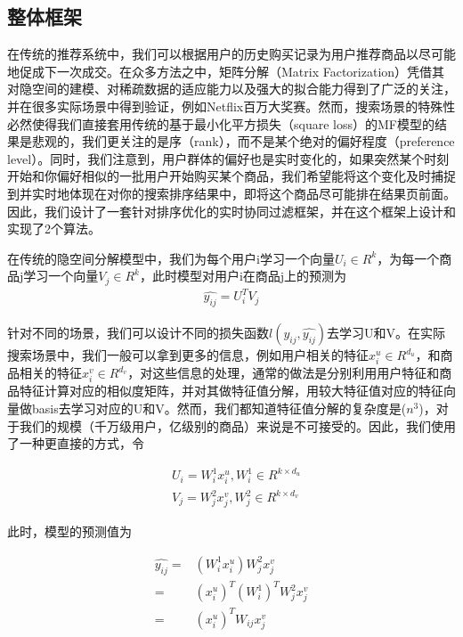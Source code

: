 \subsection{整体框架} 
 在传统的推荐系统中，我们可以根据用户的历史购买记录为用户推荐商品以尽可能地促成下一次成交。在众多方法之中，矩阵分解（Matrix Factorization）凭借其对隐空间的建模、对稀疏数据的适应能力以及强大的拟合能力得到了广泛的关注，并在很多实际场景中得到验证，例如Netflix百万大奖赛。然而，搜索场景的特殊性必然使得我们直接套用传统的基于最小化平方损失（square loss）的MF模型的结果是悲观的，我们更关注的是序（rank），而不是某个绝对的偏好程度（preference level）。同时，我们注意到，用户群体的偏好也是实时变化的，如果突然某个时刻开始和你偏好相似的一批用户开始购买某个商品，我们希望能将这个变化及时捕捉到并实时地体现在对你的搜索排序结果中，即将这个商品尽可能排在结果页前面。因此，我们设计了一套针对排序优化的实时协同过滤框架，并在这个框架上设计和实现了2个算法。

  在传统的隐空间分解模型中，我们为每个用户i学习一个向量$U_i \in R^k$，为每一个商品j学习一个向量$V_j \in R^k$，此时模型对用户i在商品j上的预测为
 \begin{equation}\label{yij}
	\begin{split}
		\hat{y_{ij}} = U^T_i V_j
	\end{split}
\end{equation}
 
  针对不同的场景，我们可以设计不同的损失函数$l(y_{ij},\hat{y_{ij}})$去学习U和V。在实际搜索场景中，我们一般可以拿到更多的信息，例如用户相关的特征$x_i^u \in R^{d_u}$，和商品相关的特征$x_i^v \in R^{d_v}$，对这些信息的处理，通常的做法是分别利用用户特征和商品特征计算对应的相似度矩阵，并对其做特征值分解，用较大特征值对应的特征向量做basis去学习对应的U和V。然而，我们都知道特征值分解的复杂度是($n^3$)，对于我们的规模（千万级用户，亿级别的商品）来说是不可接受的。因此，我们使用了一种更直接的方式，令
 
     \begin{equation}\label{uv}
	\begin{split}
		&U_i = W_i^1 x_i^u,  W_i^1 \in R^{k \times d_u} \\
   		&V_j = W_j^2 x_j^v,  W_j^2 \in R^{k \times d_v}
	\end{split}
\end{equation}

		
此时，模型的预测值为

   \begin{equation}\label{uv2}
	\begin{split}
		\hat{y_{ij}} = & (W_i^1 x_i^u) W_j^2 x_j^v \\
      		                 = & (x_i^u)^T (W_i^1)^T W_j^2 x_j^v \\
		                 = & (x_i^u)^T W_{ij} x_j^v
	\end{split}
\end{equation}

